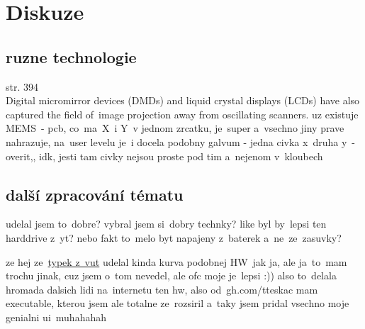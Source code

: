 \chapter{Diskuze}
\section{ruzne technologie}
\cite{scanning-handbook} str. 394 \\
Digital micromirror devices (DMDs) and
liquid crystal displays (LCDs) have also captured the field of~image projection away from
oscillating scanners.
uz existuje MEMS~\cite{mems-review}- pcb, co~ma~X~i Y~v jednom zrcatku, je~super a~vsechno jiny prave nahrazuje, na~user levelu je~i docela podobny galvum - jedna civka x~druha y~- overit,, idk, jesti tam civky nejsou proste pod tim a~nejenom v~kloubech



\section{další zpracování tématu}
udelal jsem to~dobre? vybral jsem si~dobry technky?
like byl by~lepsi ten harddrive z~yt?
nebo fakt to~melo byt napajeny z~baterek a~ne~ze~zasuvky?

ze hej ze~\href{https://dspace.vutbr.cz/bitstream/handle/11012/38621/final-thesis.pdf?sequence=-1}{typek z~vut} udelal kinda kurva podobnej HW~jak ja, ale ja~to~mam trochu jinak, cuz jsem o~tom nevedel, ale ofc moje je~lepsi :))
also to~delala hromada dalsich lidi na~internetu ten hw, also od~gh.com/tteskac mam executable, kterou jsem ale totalne ze~rozsiril a~taky jsem pridal vsechno moje genialni ui~muhahahah

